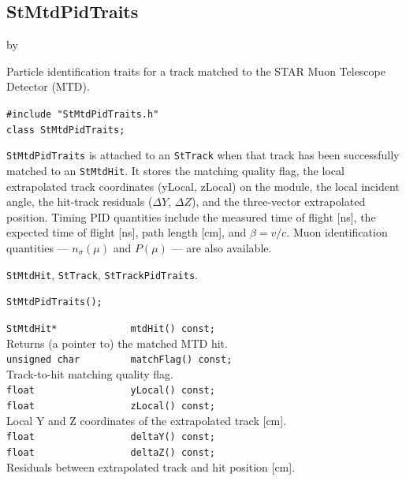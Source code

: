 \documentclass[twoside]{article}
\newcommand{\entrylabel}[1]{\mbox{\textbf{{#1}}}\hfil}%
\newenvironment{entry}
{\begin{list}{}%
    {\renewcommand{\makelabel}{\entrylabel}%
     \setlength{\labelwidth}{90pt}%
     \setlength{\leftmargin}{\labelwidth}
     \advance\leftmargin by \labelsep%
      }%
    }%
  {\end{list}}
\newcommand{\Entrylabel}[1]%
{\raisebox{0pt}[1ex][0pt]{\makebox[\labelwidth][l]%
    {\parbox[t]{\labelwidth}{\hspace{0pt}\textbf{{#1}}}}}}
\newenvironment{Entry}%
{\renewcommand{\entrylabel}{\Entrylabel}\begin{entry}}%
  {\end{entry}}
\begin{document}
\subsection{StMtdPidTraits}
\label{sec:StMtdPidTraits}
\begin{Entry}
\item[Summary] Particle identification traits for a track matched to the
    STAR Muon Telescope Detector (MTD).
\item[Synopsis]
    \verb+#include "StMtdPidTraits.h"+\\
    \verb+class StMtdPidTraits;+\\
\item[Description]
    \texttt{StMtdPidTraits} is attached to an \texttt{StTrack} when that
    track has been successfully matched to an \texttt{StMtdHit}.  It stores
    the matching quality flag, the local extrapolated track coordinates
    (yLocal, zLocal) on the module, the local incident angle, the hit-track
    residuals ($\Delta Y$, $\Delta Z$), and the three-vector extrapolated
    position.  Timing PID quantities include the measured time of flight [ns],
    the expected time of flight [ns], path length [cm], and $\beta=v/c$.
    Muon identification quantities --- $n_\sigma(\mu)$ and
    $P(\mu)$ --- are also available.
\item[Related Classes]
    \texttt{StMtdHit}, \texttt{StTrack}, \texttt{StTrackPidTraits}.
\item[Public\\ Constructors]
    \verb+StMtdPidTraits();+\\
\item[Public Member\\ Functions]
    \verb+StMtdHit*             mtdHit() const;+\\
    Returns (a pointer to) the matched MTD hit.\\
    \verb+unsigned char         matchFlag() const;+\\
    Track-to-hit matching quality flag.\\
    \verb+float                 yLocal() const;+\\
    \verb+float                 zLocal() const;+\\
    Local Y and Z coordinates of the extrapolated track [cm].\\
    \verb+float                 deltaY() const;+\\
    \verb+float                 deltaZ() const;+\\
    Residuals between extrapolated track and hit position [cm].\\

\end{Entry}
\end{document}
